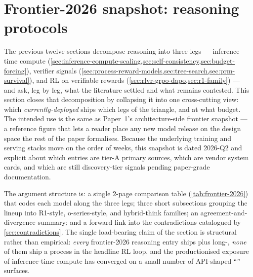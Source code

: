 
\section{Frontier-2026 snapshot: reasoning protocols}
\label{sec:frontier-2026}
\label{sec:frontier-snapshot}

The previous twelve sections decompose reasoning into three legs ---
inference-time compute (\cref{sec:inference-compute-scaling,sec:self-consistency,sec:budget-forcing}), verifier signals
(\cref{sec:process-reward-models,sec:tree-search,sec:prm-survival}), and
RL on verifiable rewards
(\cref{sec:rlvr-grpo-dapo,sec:r1-family}) --- and ask, leg by leg, what
the literature settled and what remains contested. This section closes
that decomposition by collapsing it into one cross-cutting view: which
\emph{currently-deployed}  ships which legs of the
triangle, and at what budget. The intended use is the same as Paper~1's
architecture-side frontier snapshot --- a reference figure that lets a
reader place any new model release on the design space the rest of the
paper formalises. Because the underlying training and serving stacks
move on the order of weeks, this snapshot is dated 2026-Q2 and explicit
about which entries are tier-A primary sources, which are vendor system
cards, and which are still discovery-tier signals pending paper-grade
documentation.

The argument structure is: a single 2-page comparison table
(\cref{tab:frontier-2026}) that codes each model along the three legs;
three short subsections grouping the lineup into R1-style, o-series-style,
and hybrid-think families; an agreement-and-divergence summary; and a
forward link into the contradictions catalogued by \cref{sec:contradictions}.
The single load-bearing claim of the section is structural rather than
empirical: \emph{every} frontier-2026 reasoning entry ships  plus
long-, \emph{none} of them ship a process  in the headline
RL loop, and the productionised exposure of inference-time compute has
converged on a small number of API-shaped ``'' surfaces.

